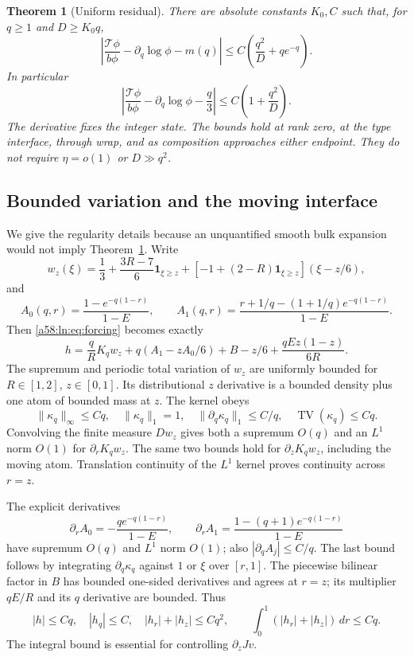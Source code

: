\documentclass[11pt,letterpaper]{article}
\newtheorem{theorem}{Theorem}[section]
\theoremstyle{remark}
\newcommand{\TT}{\mathcal T}
\newcommand{\one}{\mathbf 1}
\newcommand{\TV}{\operatorname{TV}}
\newcommand{\dd}{\,d}
\begin{document}
\begin{theorem}[Uniform residual]\label{a58:ln:thm:residual}
There are absolute constants $K_0,C$ such that, for $q\ge1$ and
$D\ge K_0q$,
\begin{equation}\label{a58:ln:eq:sharpresidual}
 \left|\frac{\TT\phi}{b\phi}-\partial_q\log\phi-m(q)\right|
 \le C\left(\frac{q^2}D+qe^{-q}\right).
\end{equation}
In particular
\begin{equation}\label{a58:ln:eq:roughsharp}
 \left|\frac{\TT\phi}{b\phi}-\partial_q\log\phi-\frac q3\right|
 \le C\left(1+\frac{q^2}D\right).
\end{equation}
The derivative fixes the integer state. The bounds hold at rank zero,
at the type interface, through wrap, and as composition approaches either
endpoint. They do not require $\eta=o(1)$ or $D\gg q^2$.
\end{theorem}

\subsection{Bounded variation and the moving interface}
We give the regularity details because an unquantified smooth bulk
expansion would not imply Theorem~\ref{a58:ln:thm:residual}. Write
\[
 w_z(\xi)=\frac13+\frac{3R-7}{6}\one_{\xi\ge z}
 +[-1+(2-R)\one_{\xi\ge z}](\xi-z/6),
\]
and
\[
 A_0(q,r)=\frac{1-e^{-q(1-r)}}{1-E},\qquad
 A_1(q,r)=\frac{r+1/q-(1+1/q)e^{-q(1-r)}}{1-E}.
\]
Then \eqref{a58:ln:eq:forcing} becomes exactly
\begin{equation}\label{a58:ln:eq:hdecomposition}
 h=\frac qR K_qw_z+q(A_1-zA_0/6)
       +B-z/6+\frac{qEz(1-z)}{6R}.
\end{equation}
The supremum and periodic total variation of $w_z$ are uniformly bounded
for $R\in[1,2]$, $z\in[0,1]$. Its distributional $z$ derivative is a
bounded density plus one atom of bounded mass at $z$. The kernel obeys
\[
 \|\kappa_q\|_\infty\le Cq,\quad \|\kappa_q\|_1=1,\quad
 \|\partial_q\kappa_q\|_1\le C/q,\quad \TV(\kappa_q)\le Cq.
\]
Convolving the finite measure $Dw_z$ gives both a supremum $O(q)$ and
an $L^1$ norm $O(1)$ for $\partial_rK_qw_z$. The same two bounds hold
for $\partial_zK_qw_z$, including the moving atom. Translation continuity
of the $L^1$ kernel proves continuity across $r=z$.

The explicit derivatives
\[
 \partial_r A_0=-\frac{qe^{-q(1-r)}}{1-E},\qquad
 \partial_r A_1=\frac{1-(q+1)e^{-q(1-r)}}{1-E}
\]
have supremum $O(q)$ and $L^1$ norm $O(1)$; also
$|\partial_qA_j|\le C/q$. The last bound follows by integrating
$\partial_q\kappa_q$ against $1$ or $\xi$ over $[r,1]$.
The piecewise bilinear factor in $B$ has bounded one-sided derivatives
and agrees at $r=z$; its multiplier $qE/R$ and its $q$ derivative are
bounded. Thus
\begin{equation}\label{a58:ln:eq:hregularity}
 |h|\le Cq,\quad |h_q|\le C,\quad |h_r|+|h_z|\le Cq^2,
 \qquad \int_0^1(|h_r|+|h_z|)\dd r\le Cq.
\end{equation}
The integral bound is essential for controlling $\partial_zJv$.
\end{document}
